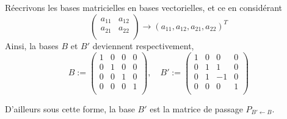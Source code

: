 \subsection{}
Réecrivons les bases matricielles en bases vectorielles, et ce en considérant 
\[
\begin{pmatrix}
a_{11} & a_{12} \\
a_{21} & a_{22} \\
\end{pmatrix}
\longrightarrow (a_{11},a_{12},a_{21},a_{22})^T\]
Ainsi, la bases $B$ et $B'$ deviennent respectivement,
\[B:=
\begin{pmatrix}
1 & 0 & 0 & 0 \\
0 & 1 & 0 & 0 \\
0 & 0 & 1 & 0 \\
0 & 0 & 0 & 1 \\
\end{pmatrix},\quad B':=
\begin{pmatrix}
1 & 0 & 0 & 0 \\
0 & 1 & 1 & 0 \\
0 & 1 & -1 & 0 \\
0 & 0 & 0 & 1 \\
\end{pmatrix}
\]

D'ailleurs sous cette forme, la base $B'$ est la matrice de passage $P_{B'\leftarrow B}$.

